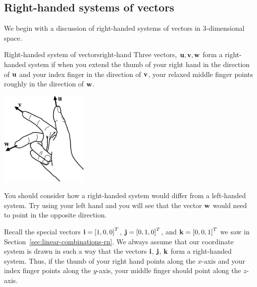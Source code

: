 \subsection{Right-handed systems of vectors}

We begin with a discussion of right-handed systems of vectors in
$3$-dimensional space.%
%

\begin{definition}{Right-handed system of vectors}{right-hand}
  Three vectors, $\vect{u},\vect{v},\vect{w}$ form a right-handed
  system if when you extend the thumb of your right hand in the
  direction of $\vect{u}$ and your index finger in the direction of
  $\vect{v}$, your relaxed middle finger points roughly in the
  direction of $\vect{w}$.
  \begin{center}
    \hspace{1in}
    \includegraphics[height=1.8in]{figures/right-handed}
  \end{center}
\end{definition}

You should consider how a right-handed system would differ from a
left-handed system. Try using your left hand and you will see that the
vector $\vect{w}$ would need to point in the opposite direction.

Recall the special vectors $\vect{i}=\mat{1,0,0}^T$,
$\vect{j}=\mat{0,1,0}^T$, and $\vect{k}=\mat{0,0,1}^T$ we saw in
Section~\ref{sec:linear-combinations-rn}. We always assume that our
coordinate system is drawn in such a way that the vectors $\vect{i}$,
$\vect{j}$, $\vect{k}$ form a right-handed system. Thus, if the thumb
of your right hand points along the $x$-axis and your index finger
points along the $y$-axis, your middle finger should point along the
$z$-axis.

